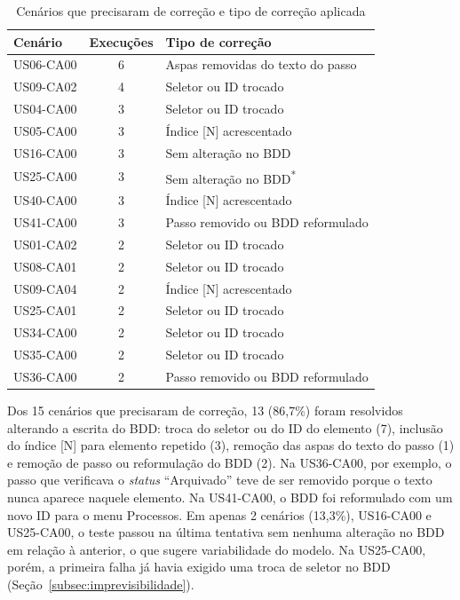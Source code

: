 \begin{table}[htb]
\centering
\caption{Cenários que precisaram de correção e tipo de correção aplicada}
\label{tab:correcoes}
\begin{tabular}{lcl}
\hline
\textbf{Cenário} & \textbf{Execuções} & \textbf{Tipo de correção} \\
\hline
US06-CA00 & 6 & Aspas removidas do texto do passo \\
US09-CA02 & 4 & Seletor ou ID trocado \\
US04-CA00 & 3 & Seletor ou ID trocado \\
US05-CA00 & 3 & Índice [N] acrescentado \\
US16-CA00 & 3 & Sem alteração no BDD \\
US25-CA00 & 3 & Sem alteração no BDD\textsuperscript{*} \\
US40-CA00 & 3 & Índice [N] acrescentado \\
US41-CA00 & 3 & Passo removido ou BDD reformulado \\
US01-CA02 & 2 & Seletor ou ID trocado \\
US08-CA01 & 2 & Seletor ou ID trocado \\
US09-CA04 & 2 & Índice [N] acrescentado \\
US25-CA01 & 2 & Seletor ou ID trocado \\
US34-CA00 & 2 & Seletor ou ID trocado \\
US35-CA00 & 2 & Seletor ou ID trocado \\
US36-CA00 & 2 & Passo removido ou BDD reformulado \\
\hline
\end{tabular}
\end{table}

Dos 15 cenários que precisaram de correção, 13 (86,7\%) foram resolvidos alterando a escrita do BDD: troca do seletor ou do ID do elemento (7), inclusão do índice [N] para elemento repetido (3), remoção das aspas do texto do passo (1) e remoção de passo ou reformulação do BDD (2). Na US36-CA00, por exemplo, o passo que verificava o \textit{status} ``Arquivado'' teve de ser removido porque o texto nunca aparece naquele elemento. Na US41-CA00, o BDD foi reformulado com um novo ID para o menu Processos. Em apenas 2 cenários (13,3\%), US16-CA00 e US25-CA00, o teste passou na última tentativa sem nenhuma alteração no BDD em relação à anterior, o que sugere variabilidade do modelo. Na US25-CA00, porém, a primeira falha já havia exigido uma troca de seletor no BDD (Seção~\ref{subsec:imprevisibilidade}).

